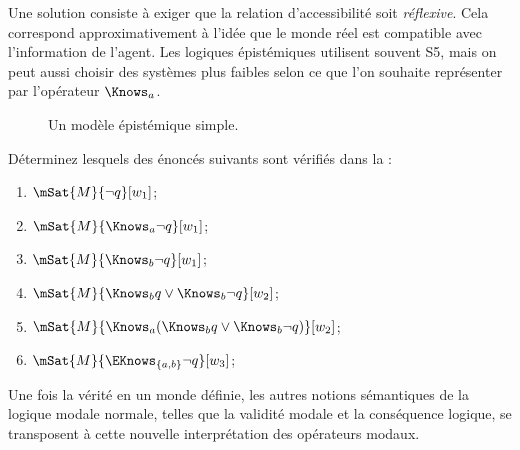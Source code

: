 \documentclass[../../../include/open-logic-section]{subfiles}
\begin{document}
Une solution consiste à exiger que la relation d'accessibilité soit
\emph{réflexive}. Cela correspond approximativement à l'idée que le
monde réel est compatible avec l'information de l'agent. Les logiques
épistémiques utilisent souvent S5, mais on peut aussi choisir des
systèmes plus faibles selon ce que l'on souhaite représenter par
l'opérateur $\Knows_a$.

\begin{figure}
  \begin{center}
  \end{center}
  \caption{Un modèle épistémique simple.}
\end{figure}

\begin{prob}
  Déterminez lesquels des énoncés suivants sont vérifiés dans
  la  :
  \begin{enumerate}
    \item $\mSat{M}{\lnot q}[w_1]$;
    \item $\mSat{M}{\Knows_a \lnot q}[w_1]$;
    \item $\mSat{M}{\Knows_b \lnot q}[w_1]$;
    \item $\mSat{M}{\Knows_b q \lor \Knows_b \lnot q}[w_2]$;
    \item $\mSat{M}{\Knows_a( \Knows_b q \lor \Knows_b \lnot q)}[w_2]$;
    \item $\mSat{M}{\EKnows_{\{a,b\}} \lnot q}[w_3]$;
    \end{enumerate}
\end{prob}

Une fois la vérité en un monde définie, les autres notions sémantiques
de la logique modale normale, telles que la validité modale et la
conséquence logique, se transposent à cette nouvelle interprétation
des opérateurs modaux.
\end{document}
